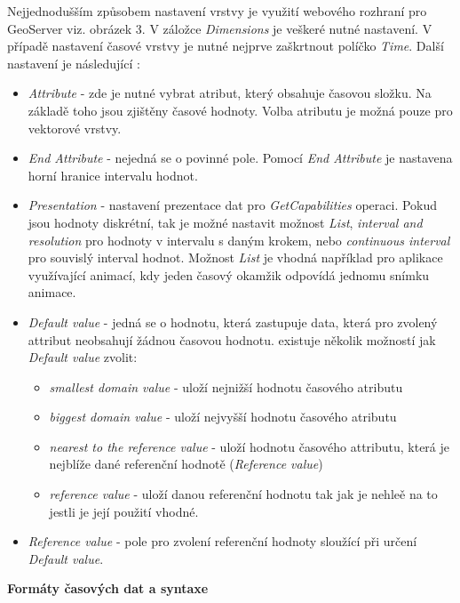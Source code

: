 Nejjednodušším způsobem nastavení vrstvy je využití webového rozhraní pro GeoServer viz. obrázek 3. V záložce \textit{Dimensions} je veškeré nutné nastavení. V případě nastavení časové vrstvy je nutné nejprve zaškrtnout políčko \textit{Time}. Další nastavení je následující \cite{geoserver-layer-edit}:

\begin{itemize}
	\item \textit{Attribute} - zde je nutné vybrat atribut, který obsahuje časovou složku. Na základě toho jsou zjištěny časové hodnoty. Volba atributu je možná pouze pro vektorové vrstvy.  
	\item \textit{End Attribute} - nejedná se o povinné pole. Pomocí \textit{End Attribute} je nastavena horní hranice intervalu hodnot. 
	\item \textit{Presentation} - nastavení prezentace dat pro \textit{GetCapabilities} operaci. Pokud jsou hodnoty diskrétní, tak je možné nastavit možnost \textit{List}, \textit{interval and resolution} pro hodnoty v intervalu s daným krokem, nebo \textit{continuous interval} pro souvislý interval hodnot. Možnost \textit{List} je vhodná například pro aplikace využívající animací, kdy jeden časový okamžik odpovídá jednomu snímku animace.
	\item \textit{Default value} - jedná se o hodnotu, která zastupuje data, která pro zvolený attribut neobsahují žádnou časovou hodnotu. existuje několik možností jak \textit{Default value} zvolit:    
	\begin{itemize}
		\item \textit{smallest domain value} - uloží nejnižší hodnotu časového atributu
		\item \textit{biggest domain value} - uloží nejvyšší hodnotu časového atributu
		\item \textit{nearest to the reference value} - uloží hodnotu časového attributu, která je nejblíže dané referenční hodnotě (\textit{Reference value}) 
		\item \textit{reference value} - uloží danou referenční hodnotu tak jak je nehleě na to jestli je její použití vhodné.   
	\end{itemize}
	\item \textit{Reference value} - pole pro zvolení referenční hodnoty sloužící při určení \textit{Default value}.
\end{itemize}

\bigskip
\noindent
\textbf{Formáty časových dat a syntaxe}

